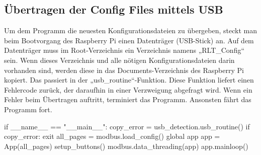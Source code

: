 \subsection{Übertragen der Config Files mittels USB}
Um dem Programm die neuesten Konfigurationsdateien zu übergeben, steckt man beim Bootvorgang des Raspberry Pi einen Datenträger (USB-Stick) an. Auf dem Datenträger muss im Root-Verzeichnis ein Verzeichnis namens „RLT\_Config“ sein. Wenn dieses Verzeichnis und alle nötigen Konfigurationsdateien darin vorhanden sind, werden diese in das Documents-Verzeichnis des Raspberry Pi kopiert. Das passiert in der „usb\_routine“-Funktion. Diese Funktion liefert einen Fehlercode zurück, der daraufhin in einer Verzweigung abgefragt wird. Wenn ein Fehler beim Übertragen auftritt, terminiert das Programm. Ansonsten fährt das Programm fort.


\begin{pythoncode}
if __name__ == "__main__":
	copy_error = usb_detection.usb_routine()
	if copy_error:
		exit
	all_pages = modbus.load_config()
	global app
	app = App(all_pages)
	setup_buttons()
	modbus.data_threading(app)
	app.mainloop()	
\end{pythoncode}